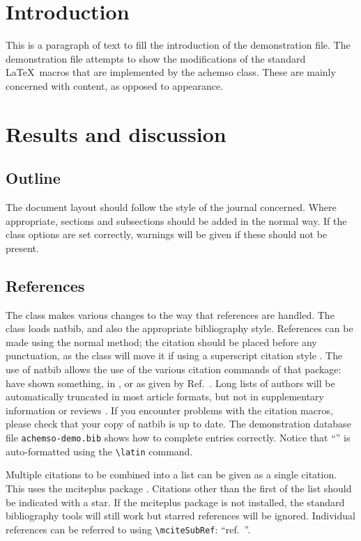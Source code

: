 \documentclass[journal=jpca,manuscript=article]{achemso}
\begin{document}
\section{Introduction}
This is a paragraph of text to fill the introduction of the
demonstration file.  The demonstration file attempts to show the
modifications of the standard \LaTeX\ macros that are implemented by
the \textsf{achemso} class.  These are mainly concerned with content,
as opposed to appearance.

\section{Results and discussion}

\subsection{Outline}

The document layout should follow the style of the journal concerned.
Where appropriate, sections and subsections should be added in the
normal way. If the class options are set correctly, warnings will be
given if these should not be present.

\subsection{References}

The class makes various changes to the way that references are
handled.  The class loads \textsf{natbib}, and also the
appropriate bibliography style.  References can be made using
the normal method; the citation should be placed before any
punctuation, as the class will move it if using a superscript
citation style
\cite{Mena2000,Abernethy2003,Friedman-Hill2003,EuropeanCommission2008}.
The use of \textsf{natbib} allows the use of the various citation
commands of that package: \citeauthor{Abernethy2003} have shown
something, in \citeyear{Cotton1999}, or as given by
Ref.~.  Long lists of authors will be
automatically truncated in most article formats, but not in
supplementary information or reviews \cite{Pople2003}. If you
encounter problems with the citation macros, please check that
your copy of \textsf{natbib} is up to date. The demonstration
database file \texttt{achemso-demo.bib} shows how to complete
entries correctly. Notice that ``'' is auto-formatted
using the \texttt{\textbackslash latin} command.

Multiple citations to be combined into a list can be given as
a single citation.  This uses the \textsf{mciteplus} package
\cite{Johnson1972,*Arduengo1992,*Eisenstein2005,*Arduengo1994}.
Citations other than the first of the list should be indicated
with a star. If the \textsf{mciteplus} package is not installed,
the standard bibliography tools will still work but starred
references will be ignored. Individual references can be referred
to using \texttt{\textbackslash mciteSubRef}:
``ref.~''.
\end{document}
